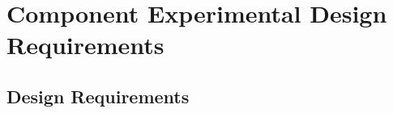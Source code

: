 \documentclass{article}
\renewcommand{\thesubsubsection}{}
\begin{document}


\section{Component Experimental Design Requirements}
\renewcommand{\thesubsubsection}{} %

   
\subsection{Design Requirements}    
\end{document}
